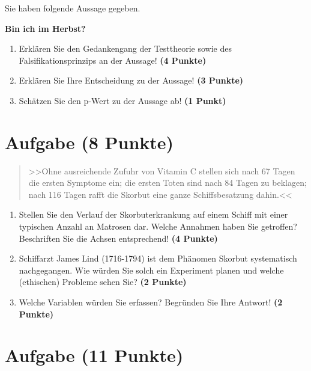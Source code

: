 \documentclass[a4paper, 10pt]{scrartcl}\usepackage[]{graphicx}\usepackage[]{xcolor}
\begin{document}
Sie haben folgende Aussage gegeben.

\begin{center}
  \Large\textbf{Bin ich im Herbst?}
\end{center}

\begin{enumerate}
\item Erkl{\"a}ren Sie den Gedankengang der Testtheorie sowie des Falsifikationsprinzips an der Aussage! \textbf{(4 Punkte)}
\item Erkl{\"a}ren Sie Ihre Entscheidung zu der Aussage! \textbf{(3 Punkte)}
\item Sch{\"a}tzen Sie den p-Wert zu der Aussage ab! \textbf{(1 Punkt)}
\end{enumerate}

 
\clearpage

\section{Aufgabe \hfill (8 Punkte)}



\begin{quote}
  >>Ohne ausreichende Zufuhr von Vitamin C stellen sich nach 67 Tagen die
  ersten Symptome ein; die ersten Toten sind nach 84 Tagen zu beklagen;
  nach 116 Tagen rafft die Skorbut eine ganze Schiffsbesatzung dahin.<<
\end{quote}


\begin{enumerate}
\item Stellen Sie den Verlauf der Skorbuterkrankung auf einem Schiff mit
  einer typischen Anzahl an Matrosen dar. Welche Annahmen haben Sie
  getroffen? Beschriften Sie die Achsen entsprechend!  \textbf{(4 Punkte)}
\item Schiffarzt James Lind (1716-1794) ist dem Ph{\"a}nomen Skorbut
  systematisch nachgegangen. Wie w{\"u}rden Sie solch ein Experiment planen und
  welche (ethischen) Probleme sehen Sie? \textbf{(2 Punkte)}
\item Welche Variablen w{\"u}rden Sie erfassen? Begr{\"u}nden Sie Ihre Antwort!
  \textbf{(2 Punkte)}
\end{enumerate} 
\clearpage

\section{Aufgabe \hfill (11 Punkte)}
\end{document}
